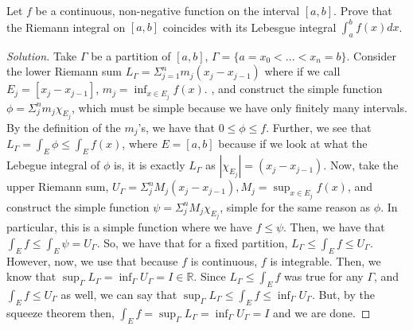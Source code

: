 \documentclass[10pt]{article}
\newenvironment{problem}[2][Problem]{\begin{trivlist}
\item[\hskip \labelsep {\bfseries #1}\hskip \labelsep {\bfseries #2.}]}{\end{trivlist}}
\begin{document}
\begin{problem}{4.2.14}
Let $f$ be a continuous, non-negative function on the interval $[a,b]$. Prove that the Riemann integral on $[a,b]$ coincides with its Lebesgue integral $\int_a^b f(x) dx$.
\end{problem}
\begin{proof}[Solution]
Take $\Gamma$ be a partition of $[a,b]$, $\Gamma = \{ a = x_0 < ... < x_n = b \}$. Consider the lower Riemann sum $L_\Gamma = \Sigma_{j=1}^n m_j (x_j - x_{j-1})$ where if we call $E_j = [x_j - x_{j-1}]$, $m_j = \inf_{ x \in   E_j} f(x)$. , and construct the simple function $\phi = \Sigma_j^n m_j \chi_{E_j}$, which must be simple because we have only finitely many intervals. By the definition of the $m_j$'s, we have that $0 \leq \phi \leq f$. Further, we see that $L_\Gamma = \int_E \phi \leq \int_E f(x)$, where $E = [a,b]$ because if we look at what the Lebegue integral of $\phi$ is, it is exactly $L_\Gamma$ as $|\chi_{E_j}| = (x_j - x_{j-1})$. Now, take the upper Riemann sum, $U_\Gamma = \Sigma_j^n M_j (x_j - x_{j-1}), M_j =  \sup_{ x \in   E_j} f(x)$, and construct the simple function $\psi = \Sigma_j^n M_j \chi_{E_j}$, simple for the same reason as $\phi$. In particular, this is a simple function where we have $f \leq \psi$. Then, we have that $\int_E f \leq \int_E \psi = U_\Gamma$. So, we have that for a fixed partition, $L_\Gamma \leq \int_E f \leq U_\Gamma$. However, now, we use that because $f$ is continuous, $f$ is integrable. Then, we know that $\sup_\Gamma L_\Gamma = \inf_\Gamma U_\Gamma = I \in \mathbb{R}$. Since $L_\Gamma \leq \int_E f$ was true for any $\Gamma$, and $\int_E f \leq U_\Gamma$ as well, we can say that $\sup_\Gamma L_\Gamma \leq \int_E f\leq  \inf_\Gamma U_\Gamma$. But, by the squeeze theorem then, $\int_E f = \sup_\Gamma L_\Gamma = \inf_\Gamma U_\Gamma = I$ and we are done.
\end{proof}
 
\end{document}
